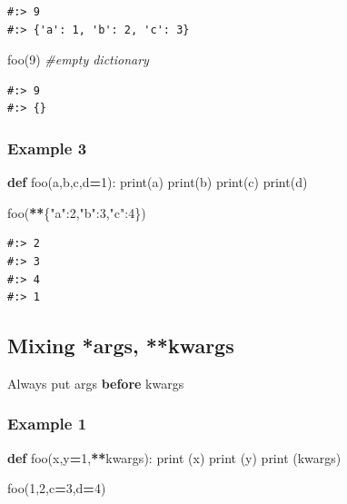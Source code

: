 \documentclass[
]{book}
\newenvironment{Shaded}{\begin{snugshade}}{\end{snugshade}}
\newcommand{\BuiltInTok}[1]{#1}
\newcommand{\CommentTok}[1]{\textcolor[rgb]{0.37,0.37,0.37}{\textit{#1}}}
\newcommand{\DecValTok}[1]{\textcolor[rgb]{0.06,0.06,0.06}{#1}}
\newcommand{\KeywordTok}[1]{\textcolor[rgb]{0.27,0.27,0.27}{\textbf{#1}}}
\newcommand{\NormalTok}[1]{#1}
\newcommand{\OperatorTok}[1]{\textcolor[rgb]{0.43,0.43,0.43}{\textbf{#1}}}
\newcommand{\StringTok}[1]{\textcolor[rgb]{0.5,0.5,0.5}{#1}}
\begin{document}
\begin{verbatim}
#:> 9
#:> {'a': 1, 'b': 2, 'c': 3}
\end{verbatim}

\begin{Shaded}
\begin{Highlighting}[]
\NormalTok{foo(}\DecValTok{9}\NormalTok{) }\CommentTok{#empty dictionary}
\end{Highlighting}
\end{Shaded}

\begin{verbatim}
#:> 9
#:> {}
\end{verbatim}

\hypertarget{example-3-1}{%
\subsubsection{Example 3}\label{example-3-1}}

\begin{Shaded}
\begin{Highlighting}[]
\KeywordTok{def}\NormalTok{ foo(a,b,c,d}\OperatorTok{=}\DecValTok{1}\NormalTok{):}
    \BuiltInTok{print}\NormalTok{(a)}
    \BuiltInTok{print}\NormalTok{(b)}
    \BuiltInTok{print}\NormalTok{(c)}
    \BuiltInTok{print}\NormalTok{(d)}
    
\NormalTok{foo(}\OperatorTok{**}\NormalTok{\{}\StringTok{"a"}\NormalTok{:}\DecValTok{2}\NormalTok{,}\StringTok{"b"}\NormalTok{:}\DecValTok{3}\NormalTok{,}\StringTok{"c"}\NormalTok{:}\DecValTok{4}\NormalTok{\})}
\end{Highlighting}
\end{Shaded}

\begin{verbatim}
#:> 2
#:> 3
#:> 4
#:> 1
\end{verbatim}

\hypertarget{mixing-args-kwargs}{%
\subsection{Mixing *args, **kwargs}\label{mixing-args-kwargs}}

Always put args \textbf{before} kwargs

\hypertarget{example-1-2}{%
\subsubsection{Example 1}\label{example-1-2}}

\begin{Shaded}
\begin{Highlighting}[]
\KeywordTok{def}\NormalTok{ foo(x,y}\OperatorTok{=}\DecValTok{1}\NormalTok{,}\OperatorTok{**}\NormalTok{kwargs):}
    \BuiltInTok{print}\NormalTok{ (x)}
    \BuiltInTok{print}\NormalTok{ (y)}
    \BuiltInTok{print}\NormalTok{ (kwargs)}
    
\NormalTok{foo(}\DecValTok{1}\NormalTok{,}\DecValTok{2}\NormalTok{,c}\OperatorTok{=}\DecValTok{3}\NormalTok{,d}\OperatorTok{=}\DecValTok{4}\NormalTok{)}
\end{Highlighting}
\end{Shaded}
\end{document}
